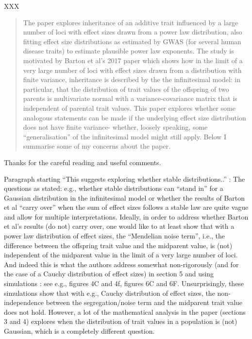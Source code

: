 XXX



\begin{quote}
The paper explores inheritance of an additive trait influenced by a large number of loci with effect sizes drawn from a power law distribution, also fitting effect size distributions as estimated by GWAS (for several human disease traits) to estimate plausible power law exponents. The study is motivated by Barton et al's 2017 paper which shows how in the limit of a very large number of loci with effect sizes drawn from a distribution with finite variance, inheritance is described by the the infinitesimal model: in particular, that the distribution of trait values of the offspring of two parents is multivariate normal with a variance-covariance matrix that is independent of parental trait values. This paper explores whether some analogous statements can be made if the underlying effect size distribution does not have finite variance- whether, loosely speaking, some ``generalisation'' of the infinitesimal model might still apply. Below I summarise some of my concerns about the paper.
\end{quote}

Thanks for the careful reading and useful comments.

\begin{point}{}
    Paragraph starting ``This suggests exploring whether stable distributions..'' \revref:
The questions as stated: e.g., whether stable distributions can ``stand in'' for a Gaussian distribution in the infinitesimal model or whether the results of Barton et al ``carry over'' when the sum of effect sizes follows a stable law are quite vague and allow for multiple interpretations. Ideally, in order to address whether Barton et al's results (do not) carry over, one would like to at least show that with a power law distribution of effect sizes, the ``Mendelian noise term'', i.e., the difference between the offspring trait value and the midparent value, is (not) independent of the midparent value in the limit of a very large number of loci. And indeed this is what the authors address
somewhat non-rigorously (and for the case of a Cauchy distribution of effect sizes) in section 5 and using simulations : see e.g., figures 4C and 4f, figures 6C and 6F. Unsurprisingly, these simulations show that with e.g., Cauchy distribution of effect sizes, the non-independence between the segregation/noise term and the midparent trait value does not hold. However, a lot of the mathematical analysis in the paper (sections 3 and 4) explores when the distribution of trait values in a population is (not) Gaussian, which is a completely different question.
\end{point}

